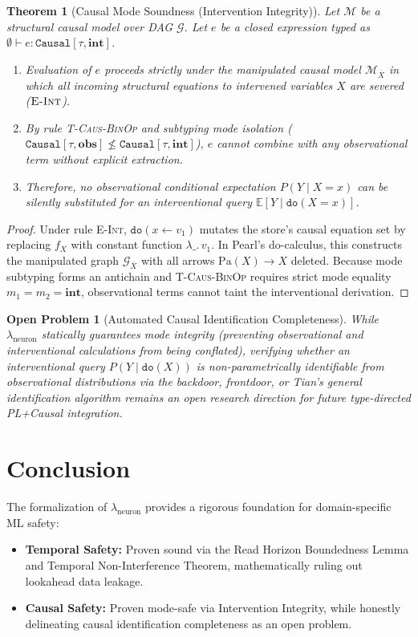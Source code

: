 \documentclass[11pt,a4paper]{article}
\theoremstyle{definition}
\theoremstyle{plain}
\newtheorem{theorem}{Theorem}[section]
\newtheorem{openproblem}{Open Problem}[section]
\newcommand{\ty}[1]{\texttt{#1}}
\newcommand{\sub}{\le}
\newcommand{\Caus}{\ty{Causal}}
\begin{document}
\begin{theorem}[Causal Mode Soundness (Intervention Integrity)]
Let $\mathcal{M}$ be a structural causal model over DAG $\mathcal{G}$.
Let $e$ be a closed expression typed as $\emptyset \vdash e : \Caus[\tau, \mathbf{int}]$.
\begin{enumerate}[itemsep=1pt]
  \item Evaluation of $e$ proceeds strictly under the manipulated causal model $\mathcal{M}_{\overline{X}}$ in which all incoming structural equations to intervened variables $X$ are severed ($\textsc{E-Int}$).
  \item By rule \textsc{T-Caus-BinOp} and subtyping mode isolation ($\Caus[\tau, \mathbf{obs}] \not\sub \Caus[\tau, \mathbf{int}]$), $e$ cannot combine with any observational term without explicit extraction.
  \item Therefore, no observational conditional expectation $P(Y \mid X=x)$ can be silently substituted for an interventional query $\mathbb{E}[Y \mid \ty{do}(X=x)]$.
\end{enumerate}
\end{theorem}
\begin{proof}
Under rule \textsc{E-Int}, $\ty{do}(x \gets v_1)$ mutates the store's causal equation set by replacing $f_X$ with constant function $\lambda\_.\, v_1$. In Pearl's do-calculus, this constructs the manipulated graph $\mathcal{G}_{\overline{X}}$ with all arrows $\text{Pa}(X) \to X$ deleted. Because mode subtyping forms an antichain and \textsc{T-Caus-BinOp} requires strict mode equality $m_1 = m_2 = \mathbf{int}$, observational terms cannot taint the interventional derivation.
\end{proof}

\begin{openproblem}[Automated Causal Identification Completeness]
While $\lambda_{\text{neuron}}$ statically guarantees \emph{mode integrity} (preventing observational and interventional calculations from being conflated), verifying whether an interventional query $P(Y \mid \ty{do}(X))$ is non-parametrically identifiable from observational distributions via the backdoor, frontdoor, or Tian's general identification algorithm remains an open research direction for future type-directed PL+Causal integration.
\end{openproblem}

\section{Conclusion}

The formalization of $\lambda_{\text{neuron}}$ provides a rigorous foundation for domain-specific ML safety:
\begin{itemize}[itemsep=1pt]
  \item \textbf{Temporal Safety:} Proven sound via the Read Horizon Boundedness Lemma and Temporal Non-Interference Theorem, mathematically ruling out lookahead data leakage.
  \item \textbf{Causal Safety:} Proven mode-safe via Intervention Integrity, while honestly delineating causal identification completeness as an open problem.
\end{itemize}
\end{document}

